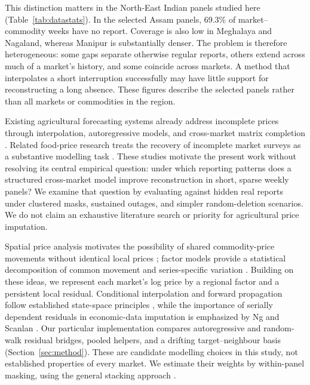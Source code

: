 \documentclass[sigconf,nonacm,balance=false]{acmart}
\begin{document}
This distinction matters in the North-East Indian panels studied here (Table~\ref{tab:datastats}). In the selected Assam panels, 69.3\% of market--commodity weeks have no report. Coverage is also low in Meghalaya and Nagaland, whereas Manipur is substantially denser. The problem is therefore heterogeneous: some gaps separate otherwise regular reports, others extend across much of a market's history, and some coincide across markets. A method that interpolates a short interruption successfully may have little support for reconstructing a long absence. These figures describe the selected panels rather than all markets or commodities in the region.

Existing agricultural forecasting systems already address incomplete prices through interpolation, autoregressive models, and cross-market matrix completion \cite{ladhar2023,ma2019,bhardwaj2023}. Related food-price research treats the recovery of incomplete market surveys as a substantive modelling task \cite{andree2021}. These studies motivate the present work without resolving its central empirical question: under which reporting patterns does a structured cross-market model improve reconstruction in short, sparse weekly panels? We examine that question by evaluating against hidden real reports under clustered masks, sustained outages, and simpler random-deletion scenarios. We do not claim an exhaustive literature search or priority for agricultural price imputation.

Spatial price analysis motivates the possibility of shared commodity-price movements without identical local prices \cite{fackler2001,barrett2002}; factor models provide a statistical decomposition of common movement and series-specific variation \cite{stock2002,banbura2014}. Building on these ideas, we represent each market's log price by a regional factor and a persistent local residual. Conditional interpolation and forward propagation follow established state-space principles \cite{harvey1984,durbin2012}, while the importance of serially dependent residuals in economic-data imputation is emphasized by Ng and Scanlan \cite{ng2024}. Our particular implementation compares autoregressive and random-walk residual bridges, pooled helpers, and a drifting target--neighbour basis (Section~\ref{sec:method}). These are candidate modelling choices in this study, not established properties of every market. We estimate their weights by within-panel masking, using the general stacking approach \cite{wolpert1992,breiman1996}.
\end{document}
